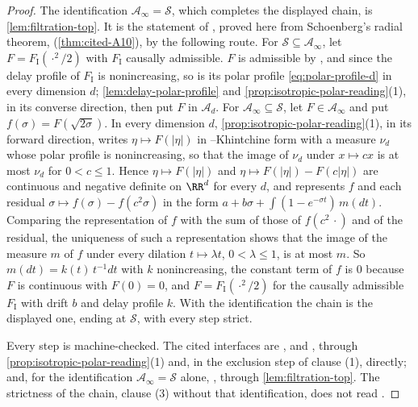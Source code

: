 \begin{proof}
The identification $\mathcal{A}_\infty = \mathcal{S}$, which completes the displayed chain, is
\ref{lem:filtration-top}. It is the statement of , proved here from
Schoenberg's radial theorem,  (\ref{thm:cited-A10}), by the following route. For
$\mathcal{S} \subseteq \mathcal{A}_\infty$, let $F = F_{\mathrm I}(\cdot^2/2)$ with $F_{\mathrm I}$
causally admissible. $F$ is admissible by , and since the delay profile of
$F_{\mathrm I}$ is nonincreasing, so is its polar profile \ref{eq:polar-profile-d} in every
dimension $d$; \ref{lem:delay-polar-profile} and \ref{prop:isotropic-polar-reading}(1), in its
converse direction, then put $F$ in $\mathcal{A}_d$. For $\mathcal{A}_\infty \subseteq \mathcal{S}$,
let $F \in \mathcal{A}_\infty$ and put $f(\sigma) = F(\sqrt{2\sigma})$. In every dimension $d$,
\ref{prop:isotropic-polar-reading}(1), in its forward direction, writes $\eta \mapsto F(|\eta|)$ in
\Levy--Khintchine form with a \Levy{} measure $\nu_d$ whose polar profile is nonincreasing, so that
the image of $\nu_d$ under $x \mapsto cx$ is at most $\nu_d$ for $0 < c \le 1$. Hence
$\eta \mapsto F(|\eta|)$ and $\eta \mapsto F(|\eta|) - F(c|\eta|)$ are continuous and negative
definite on $\RR^d$ for every $d$, and  represents $f$ and each residual
$\sigma \mapsto f(\sigma) - f(c^2\sigma)$ in the form $a + b\sigma + \int(1 - e^{-\sigma t})\,m(dt)$.
Comparing the representation of $f$ with the sum of those of $f(c^2\,\cdot)$ and of the residual,
the uniqueness of such a representation shows that the image of the measure $m$ of $f$ under every
dilation $t \mapsto \lambda t$, $0 < \lambda \le 1$, is at most $m$. So $m(dt) = k(t)\,t^{-1}dt$
with $k$ nonincreasing, the constant term of $f$ is $0$ because $F$ is continuous with $F(0) = 0$,
and $F = F_{\mathrm I}(\cdot^2/2)$ for the causally admissible $F_{\mathrm I}$ with drift $b$ and
delay profile $k$. With the identification the chain is the displayed one, ending at
$\mathcal{S}$, with every step strict.

Every step is machine-checked. The cited interfaces are ,  and ,
through \ref{prop:isotropic-polar-reading}(1) and, in the exclusion step of clause (1), 
directly; and, for the identification $\mathcal{A}_\infty = \mathcal{S}$ alone, , through
\ref{lem:filtration-top}. The strictness of the chain, clause (3) without that identification, does
not read .
\end{proof}

